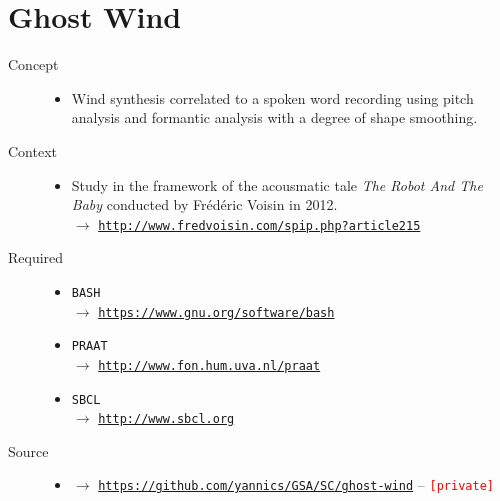 

\section*{Ghost Wind}

\thispagestyle{empty}

\bigskip

\begin{description}
\item[Concept] \hfill 
\begin{itemize}
\item[] Wind synthesis correlated to a spoken word recording using pitch analysis and formantic analysis with a degree of shape smoothing.
\end{itemize}
\bigskip
\item[Context] \hfill 
\begin{itemize}
\item[] Study in the framework of the acousmatic tale \textit{The Robot And The Baby} conducted by Fr\'{e}d\'{e}ric Voisin in 2012. \\
$\rightarrow$ \href{http://www.fredvoisin.com/spip.php?article215}{\texttt{\small http://www.fredvoisin.com/spip.php?article215}}
\end{itemize}
\bigskip
\item[Required] \hfill 
\begin{itemize}
\setlength\itemsep{1em}
\item[] \texttt{BASH} \\ $\rightarrow$ \href{https://www.gnu.org/software/bash}{\texttt{\small https://www.gnu.org/software/bash}}
\item[] \texttt{PRAAT} \\ $\rightarrow$ \href{http://www.fon.hum.uva.nl/praat}{\texttt{\small http://www.fon.hum.uva.nl/praat}} 
\item[] \texttt{SBCL} \\ $\rightarrow$ \href{http://www.sbcl.org}{\texttt{\small http://www.sbcl.org}}
\end{itemize}
\bigskip
\item[Source] \hfill 
\begin{itemize}
\item[] $\rightarrow$ \href{https://github.com/yannics/GSA/SC/ghost-wind}{\texttt{\small https://github.com/yannics/GSA/SC/ghost-wind}} -- \texttt{\textcolor{red}{\small[private]}}

\end{itemize}
\end{description}
